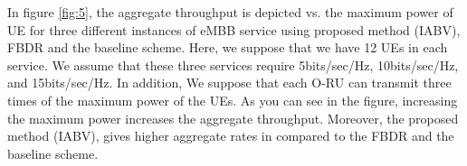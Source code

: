 \documentclass[lettersize,journal]{IEEEtran}
\begin{document}
In figure \ref{fig:5}, the aggregate throughput is depicted vs. the maximum power of UE for three different instances of eMBB service using proposed method (IABV), FBDR and the baseline scheme. Here, we suppose that we have 12 UEs in each service.  We assume that these three services require 5bits/sec/Hz, 10bits/sec/Hz, and 15bits/sec/Hz.
In addition, We suppose that each O-RU can transmit three times of the maximum power of the UEs. As you can see in the figure, increasing the maximum power increases the aggregate throughput. Moreover, the proposed method (IABV), gives higher aggregate rates in compared to the FBDR and the baseline scheme.  
\end{document}
